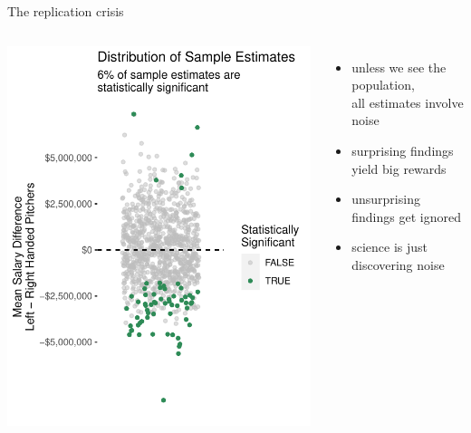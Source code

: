 \documentclass{beamer}
\begin{document}
\begin{frame}{The replication crisis}

\begin{columns}

\includegraphics[width = \textwidth]{pitchers_sample_scatter}

\begin{itemize}
\item unless we see the population,\\all estimates involve noise
\item surprising findings yield big rewards
\item unsurprising findings get ignored
\item science is just discovering noise
\end{itemize}

\end{columns}

\end{frame}
\end{document}

